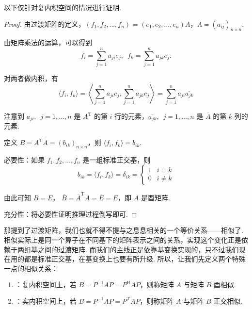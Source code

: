 以下仅针对复内积空间的情况进行证明.

\begin{proof}
    由过渡矩阵的定义，$ (f_1, f_2, \ldots , f_n) $ = $ (e_1, e_2, \ldots , e_n)A $，$ A = (a_{ij})_{n \times n} $.

    由矩阵乘法的运算，可以得到
    \[ f_i = \sum_{j = 1}^{n} a_{ji}e_j , \enspace f_k = \sum_{j = 1}^{n} a_{jk}e_j. \]

    对两者做内积，有
    \[ \langle f_i, f_k \rangle = \left\langle \sum_{j = 1}^{n} a_{ji}e_j, \sum_{j = 1}^{n} a_{jk}e_j \right\rangle = \sum_{j = 1}^{n} a_{ji}\overline{a_{jk}} \]

    注意到 $ a_{ji},\enspace j = 1, \ldots , n $ 是 $ A^{\mathrm{T}} $ 的第 $ i $ 行的元素，$ \overline{a_{jk}},\enspace j = 1, \ldots , n $ 是 $ \overline{A} $ 的第 $ k $ 列的元素.

    定义 $ B = A^{\mathrm{T}}\overline{A} = (b_{ik})_{n \times n} $，则 $ \langle f_i, f_k \rangle = b_{ik} $.

    必要性：如果 $ f_1, f_2, \ldots , f_n $ 是一组标准正交基，则
    \[b_{ik} = \langle f_i, f_k \rangle = \delta_{ik} =
        \begin{cases}
            1 & i = k    \\
            0 & i \neq k
        \end{cases}\]

    由此可知 $ B = E $， $ \overline{B} = \overline{A}^{\mathrm{T}} A = \overline{E} = E $，即 $ A $ 是酉矩阵.

    充分性：将必要性证明推理过程倒写即可.
\end{proof}

那提到了过渡矩阵，我们也就不得不提与之息息相关的一个等价关系——相似了. 相似实际上是同一个算子在不同基下的矩阵表示之间的关系，实现这个变化正是依赖于两组基之间的过渡矩阵. 而我们的主线正是依靠基变换实现的，只不过我们现在用的都是标准正交基，在基变换上也要有所升级. 所以，让我们先定义两个特殊一点的相似关系：

\begin{definition}
    \begin{enumerate}
        \item {}：复内积空间上，若 $ B = P^{-1}AP = P^{\mathrm{H}}AP $，则称矩阵 $ A $ 与矩阵 $ B $ 酉相似.

        \item {}：实内积空间上，若 $ B = P^{-1}AP = P^{\mathrm{T}}AP $，则称矩阵 $ A $ 与矩阵 $ B $ 正交相似.
    \end{enumerate}
\end{definition}

